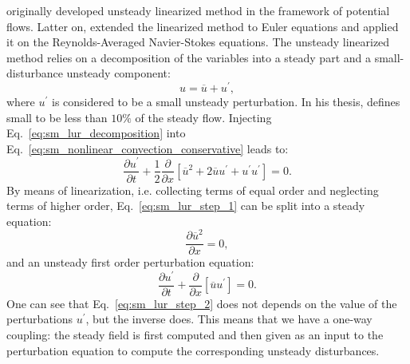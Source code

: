 
\citet{Verdon1984} originally developed unsteady linearized 
method in the framework of potential flows. Latter on, \citet{Hall1989}
extended the linearized method to Euler equations and
\citet{Clark2000} applied it on the Reynolds-Averaged Navier-Stokes equations.
The unsteady linearized method relies on a decomposition of the variables
into a steady part and a small-disturbance unsteady component:
\begin{equation}
	u = \overline{u} + u^\prime,
	\label{eq:sm_lur_decomposition}
\end{equation}
where $u^\prime$ is considered to be a small unsteady perturbation. 
In his thesis,
\citet{Hall1987} defines small to be less than $10\%$ of the
steady flow.
Injecting Eq.~\ref{eq:sm_lur_decomposition} into 
Eq.~\ref{eq:sm_nonlinear_convection_conservative} leads to:
\begin{equation}
	\frac{\partial u^\prime}{\partial t} + 
	\frac{1}{2}\frac{\partial}{\partial x} \left[
	\overline{u}^2 + 2 \overline{u} u^\prime + u^\prime u^\prime \right] = 
	0.
	\label{eq:sm_lur_step_1}
\end{equation}
By means of linearization, i.e. collecting terms
of equal order and neglecting terms of higher order, 
Eq.~\ref{eq:sm_lur_step_1} can be split
into a steady equation:
\begin{equation}
	\frac{\partial \overline{u}^2}{\partial x} = 0,
	\label{eq:sm_lur_step_2}
\end{equation}
and an unsteady first order perturbation equation:
\begin{equation}
	\frac{\partial u^\prime}{\partial t} +
	\frac{\partial}{\partial x} \left[
	\overline{u} u^\prime \right] = 
	0.
	\label{eq:sm_lur_step_3}
\end{equation}
One can see that Eq.~\ref{eq:sm_lur_step_2} does not depends
on the value of the perturbations $u^\prime$, but the 
inverse does.
This means that we have a one-way coupling: the steady field
is first computed and then given as an input to the
perturbation equation to compute
the corresponding unsteady disturbances.

